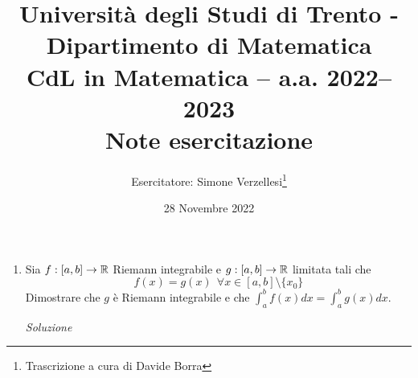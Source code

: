 \documentclass{article}
\title{Università degli Studi di Trento - Dipartimento di Matematica\\
CdL in Matematica – a.a. 2022–2023\\ Note esercitazione}
\author{Esercitatore: Simone Verzellesi\thanks{Trascrizione a cura di Davide Borra}}
\date{28 Novembre 2022}
\begin{document}
\maketitle
{}
\setlength{\headheight}{30pt}
\begin{enumerate}[label=\textbf{Esercizio 10.\arabic*.},itemindent=*]
\item Sia $f:[a,b]\to\mathbb{R}$ Riemann integrabile e $g: [a,b]\to \mathbb{R}$ limitata tali che \[f(x)=g(x)~~\forall x \in[a,b]\setminus \{x_0\}\]Dimostrare che $g$ è Riemann integrabile e che $\int_a^bf(x)dx=\int_a^bg(x)dx$.
\item[\textit{\large Soluzione~}]~

\end{enumerate}
\end{document}
